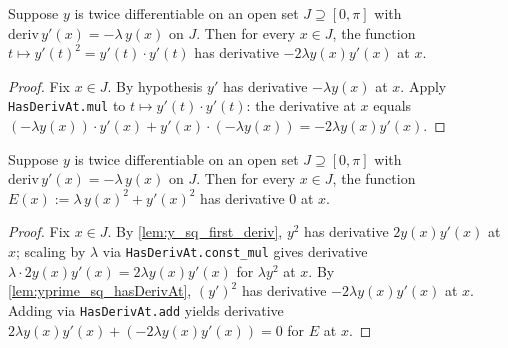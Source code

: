 \begin{lemma}[Derivative of $(y')^2$]
    \label{lem:yprime_sq_hasDerivAt}
    \leanok
    Suppose $y$ is twice differentiable on an open set $J \supseteq [0,\pi]$
    with $\mathrm{deriv}\, y'(x) = -\lambda \, y(x)$ on $J$. Then for every
    $x \in J$, the function $t \mapsto y'(t)^2 = y'(t) \cdot y'(t)$ has
    derivative $-2 \lambda y(x) y'(x)$ at $x$.
\end{lemma}
\begin{proof}
    Fix $x \in J$. By hypothesis $y'$ has derivative $-\lambda y(x)$ at $x$.
    Apply \texttt{HasDerivAt.mul} to $t \mapsto y'(t) \cdot y'(t)$: the
    derivative at $x$ equals $(-\lambda y(x)) \cdot y'(x) + y'(x) \cdot
    (-\lambda y(x)) = -2 \lambda y(x) y'(x)$.
\end{proof}

\begin{lemma}
    \label{lem:energy_hasDerivAt_zero}
    \leanok
    Suppose $y$ is twice differentiable on an open set $J \supseteq [0,\pi]$
    with $\mathrm{deriv}\, y'(x) = -\lambda \, y(x)$ on $J$. Then for every
    $x \in J$, the function
    $E(x) := \lambda \, y(x)^2 + y'(x)^2$ has derivative $0$ at $x$.
\end{lemma}
\begin{proof}
    Fix $x \in J$. By \cref{lem:y_sq_first_deriv}, $y^2$ has derivative
    $2 y(x) y'(x)$ at $x$; scaling by $\lambda$ via \texttt{HasDerivAt.const\_mul}
    gives derivative $\lambda \cdot 2 y(x) y'(x) = 2 \lambda y(x) y'(x)$ for
    $\lambda y^2$ at $x$. By \cref{lem:yprime_sq_hasDerivAt}, $(y')^2$ has
    derivative $-2 \lambda y(x) y'(x)$ at $x$. Adding via \texttt{HasDerivAt.add}
    yields derivative $2 \lambda y(x) y'(x) + (-2 \lambda y(x) y'(x)) = 0$ for
    $E$ at $x$.
\end{proof}

